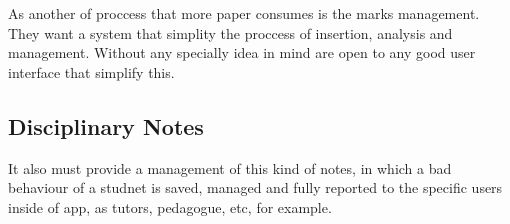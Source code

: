 \noindent{}










As another of proccess that more paper consumes is the marks management. They want a system that simplity the proccess of insertion, analysis and management. Without any specially idea in mind are open to any good user interface that simplify this.


\bigskip
\subsection{Disciplinary Notes}
\bigskip

It also must provide a management of this kind of notes, in which a bad behaviour of a studnet is saved, managed and fully reported to the specific users inside of app, as tutors, pedagogue, etc, for example.

